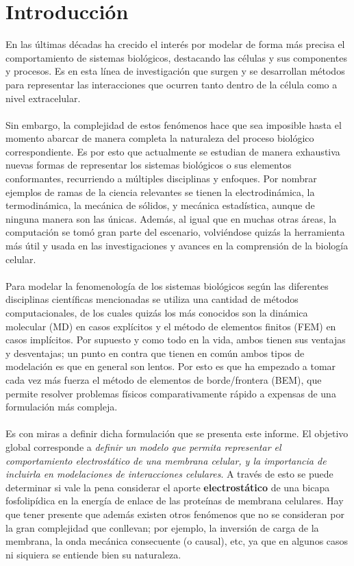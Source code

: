 \documentclass[12pt, notitlepage]{article}
\begin{document}
\section{Introducción}
En las últimas décadas ha crecido el interés por modelar de forma más precisa el comportamiento de sistemas biológicos, destacando las células y sus componentes y procesos. Es en esta línea de investigación que surgen y se desarrollan métodos para representar las interacciones que ocurren tanto dentro de la célula como a nivel extracelular.\\\\
Sin embargo, la complejidad de estos fenómenos hace que sea imposible hasta el momento abarcar de manera completa la naturaleza del proceso biológico correspondiente. Es por esto que actualmente se estudian de manera exhaustiva nuevas formas de representar los sistemas biológicos o sus elementos conformantes, recurriendo a múltiples disciplinas y enfoques. Por nombrar ejemplos de ramas de la ciencia relevantes se tienen la electrodinámica, la termodinámica, la mecánica de sólidos, y mecánica estadística, aunque de ninguna manera son las únicas. Además, al igual que en muchas otras áreas, la computación se tomó gran parte del escenario, volviéndose quizás la herramienta más útil y usada en las investigaciones y avances en la comprensión de la biología celular.\\\\
Para modelar la fenomenología de los sistemas biológicos según las diferentes disciplinas científicas mencionadas se utiliza una cantidad de métodos computacionales, de los cuales quizás los más conocidos son la dinámica molecular (MD) en casos explícitos y el método de elementos finitos (FEM) en casos implícitos. Por supuesto y como todo en la vida, ambos tienen sus ventajas y desventajas; un punto en contra que tienen en común ambos tipos de modelación es que en general son lentos. Por esto es que ha empezado a tomar cada vez más fuerza el método de elementos de borde/frontera (BEM), que permite resolver problemas físicos comparativamente rápido a expensas de una formulación más compleja.\\\\
Es con miras a definir dicha formulación que se presenta este informe. El objetivo global corresponde a \textit{definir un modelo que permita representar el comportamiento electrostático de una membrana celular, y la importancia de incluirla en modelaciones de interacciones celulares}. A través de esto se puede determinar si vale la pena considerar el aporte \textbf{electrostático} de una bicapa fosfolipídica en la energía de enlace de las proteínas de membrana celulares. Hay que tener presente que además existen otros fenómenos que no se consideran por la gran complejidad que conllevan; por ejemplo, la inversión de carga de la membrana, la onda mecánica consecuente (o causal), etc, ya que en algunos casos ni siquiera se entiende bien su naturaleza.\\\\
\end{document}
